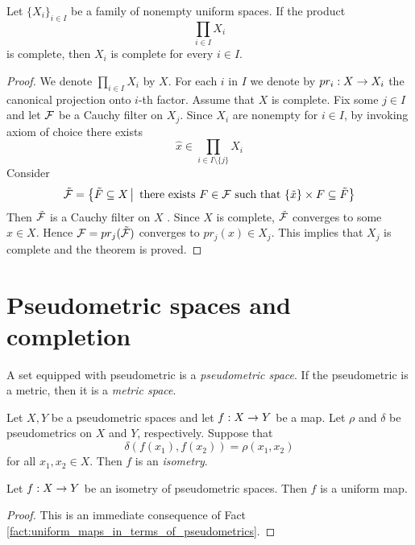 \begin{theorem}\label{theorem:complete_and_nonempty_product_implies_each_factor_is_complete}
	Let $\big\{X_i\big\}_{i\in I}$ be a family of nonempty uniform spaces. If the product
	$$\prod_{i\in I}X_i$$
	is complete, then $X_i$ is complete for every $i\in I$.
\end{theorem}
\begin{proof}
	We denote $\prod_{i\in I}X_i$ by $X$. For each $i$ in $I$ we denote by $pr_i:X \rightarrow X_i$ the canonical projection onto $i$-th factor. Assume that $X$ is complete. Fix some $j \in I$ and let ${\mathcal F}$ be a Cauchy filter on $X_j$. Since $X_i$ are nonempty for $i \in I$, by invoking axiom of choice there exists
	$$\hat{x} \in \prod_{i \in I\setminus \{j\}}X_i$$
	Consider
	$$\tilde{{\mathcal F}} = \big\{\tilde{F} \subseteq X\,\big|\,\mbox{ there exists }F\in {\mathcal F}\mbox{ such that }\{\tilde{x}\}\times F \subseteq \tilde{F}\big\}$$
	Then $\tilde{{\mathcal F}}$ is a Cauchy filter on $X$ . Since $X$ is complete, $\tilde{{\mathcal F}}$ converges to some $x \in X$. Hence ${\mathcal F} = pr_j(\tilde{{\mathcal F}})$ converges to $pr_j(x) \in X_j$. This implies that $X_j$ is complete and the theorem is proved.
\end{proof}

\section{Pseudometric spaces and completion}

\begin{definition}
	A set equipped with pseudometric is a \textit{pseudometric space}. If the pseudometric is a metric, then it is a \textit{metric space}.
\end{definition}

\begin{definition}
	Let $X,Y$ be a pseudometric spaces and let $f:X\rightarrow Y$ be a map. Let $\rho$ and $\delta$ be pseudometrics on $X$ and $Y$, respectively. Suppose that
	$$\delta\left(f(x_1),f(x_2)\right) = \rho(x_1,x_2)$$
	for all $x_1,x_2 \in X$. Then $f$ is an \textit{isometry}.
\end{definition}

\begin{corollary}\label{corollary:isometries_are_uniform_maps}
	Let $f:X\rightarrow Y$ be an isometry of pseudometric spaces. Then $f$ is a uniform map.
\end{corollary}
\begin{proof}
	This is an immediate consequence of Fact \ref{fact:uniform_maps_in_terms_of_pseudometrics}.
\end{proof}

